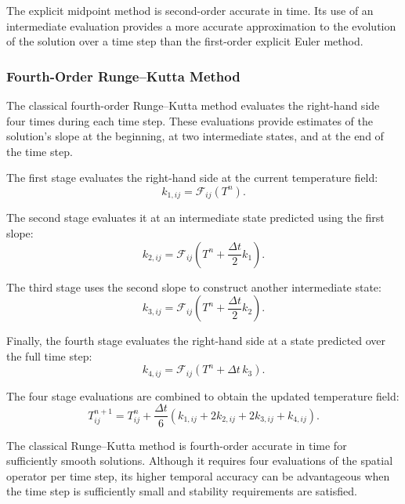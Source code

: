 The explicit midpoint method is second-order accurate in
time. Its use of an intermediate evaluation provides a more
accurate approximation to the evolution of the solution over
a time step than the first-order explicit Euler method.

\subsubsection{Fourth-Order Runge--Kutta Method}

The classical fourth-order Runge--Kutta method evaluates
the right-hand side four times during each time step. These
evaluations provide estimates of the solution's slope at
the beginning, at two intermediate states, and at the end
of the time step.

The first stage evaluates the right-hand side at the
current temperature field:
\begin{equation}
k_{1,ij}=\mathcal{F}_{ij}(T^n).
\label{eq:rk4_k1}
\end{equation}

The second stage evaluates it at an intermediate state
predicted using the first slope:
\begin{equation}
k_{2,ij}
=
\mathcal{F}_{ij}
\left(
T^n+\frac{\Delta t}{2}k_1
\right).
\label{eq:rk4_k2}
\end{equation}

The third stage uses the second slope to construct another
intermediate state:
\begin{equation}
k_{3,ij}
=
\mathcal{F}_{ij}
\left(
T^n+\frac{\Delta t}{2}k_2
\right).
\label{eq:rk4_k3}
\end{equation}

Finally, the fourth stage evaluates the right-hand side
at a state predicted over the full time step:
\begin{equation}
k_{4,ij}
=
\mathcal{F}_{ij}
\left(
T^n+\Delta t\,k_3
\right).
\label{eq:rk4_k4}
\end{equation}

The four stage evaluations are combined to obtain the
updated temperature field:
\begin{equation}
\boxed{
T_{ij}^{n+1}
=
T_{ij}^{n}
+\frac{\Delta t}{6}
\left(
k_{1,ij}
+2k_{2,ij}
+2k_{3,ij}
+k_{4,ij}
\right).
}
\label{eq:rk4_update}
\end{equation}

The classical Runge--Kutta method is fourth-order accurate
in time for sufficiently smooth solutions. Although it
requires four evaluations of the spatial operator per time
step, its higher temporal accuracy can be advantageous
when the time step is sufficiently small and stability
requirements are satisfied.

